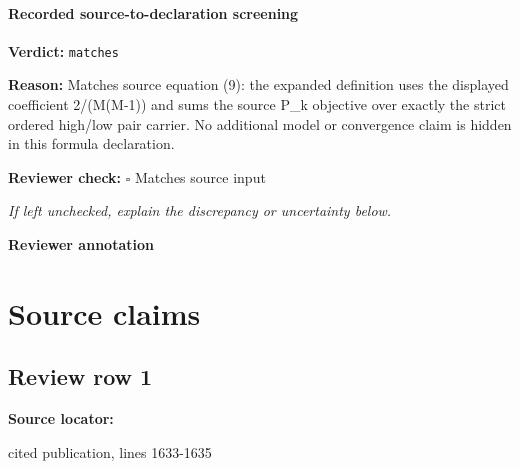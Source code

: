 \documentclass[10pt]{article}
\newcommand{\reviewerbox}{%
  \par\noindent\fbox{\parbox{0.96\linewidth}{\rule{0pt}{0.38in}}}\par
}
\newcommand{\reviewmatch}[1]{%
  \par\noindent\textbf{Reviewer check:} $\square$\; #1\par
  \noindent\emph{If left unchecked, explain the discrepancy or uncertainty below.}\par
}
\begin{document}
\paragraph{Recorded source-to-declaration screening}
\textbf{Verdict:} \texttt{matches}
\\
{\raggedright
\textbf{Reason:} Matches source equation (9):\allowbreak{} the expanded definition uses the displayed coefficient 2/\allowbreak{}(M(M-\allowbreak{}1)) and sums the source P\_\allowbreak{}k objective over exactly the strict ordered high/\allowbreak{}low pair carrier.\allowbreak{} No additional model or convergence claim is hidden in this formula declaration.\allowbreak{}
\par}
\reviewmatch{Matches source input}
\noindent\textbf{Reviewer annotation}\par
\reviewerbox

\clearpage
\hypertarget{source-claim-21cfbf055e49cb54}{}
\hypertarget{source-section-f10b5f68e4acf3dc}{}
\section*{Source claims}
\subsection*{Review row 1}
\textbf{Source locator:} {\footnotesize\raggedright cited publication, lines 1633-\allowbreak{}1635\par}
\end{document}
